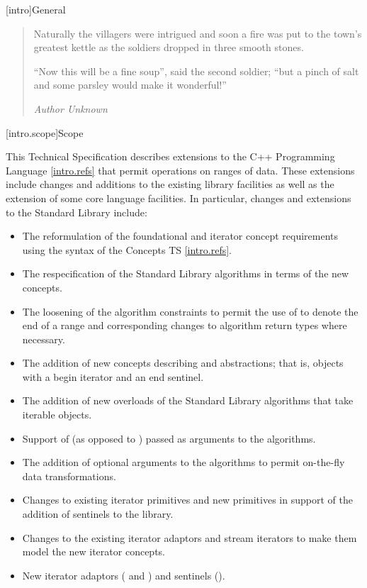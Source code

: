 [intro]{General}

\begin{quote}
Naturally the villagers were intrigued and soon a fire was put to the town's greatest
kettle as the soldiers dropped in three smooth stones.

``Now this will be a fine soup'', said the second soldier;
``but a pinch of salt and some parsley would make it wonderful!''
\begin{flushright}
\textemdash \textit{Author Unknown}
\end{flushright}
\end{quote}

[intro.scope]{Scope}

\pnum
This Technical Specification describes extensions to the C++
Programming Language \ref{intro.refs} that
permit operations on ranges of data. These extensions include
changes and additions to the existing library facilities as well
as the extension of some core language facilities. In particular,
changes and extensions to the Standard Library include:

\begin{itemize}
\item The reformulation of the foundational and iterator concept requirements
using the syntax of the Concepts TS \ref{intro.refs}.
\item The respecification of the Standard Library algorithms in terms of the new
concepts.
\item The loosening of the algorithm constraints to permit the use of
 to denote the end of a range and corresponding changes to algorithm
return types where necessary.
\item The addition of new concepts describing  and 
abstractions; that is, objects with a begin iterator and an end sentinel.
\item The addition of new overloads of the Standard Library algorithms that take iterable
objects.
\item Support of  (as opposed to )
passed as arguments to the algorithms.
\item The addition of optional  arguments to the algorithms to
permit on-the-fly data transformations.
\item Changes to existing iterator primitives and new primitives in support of the
addition of sentinels to the library.
\item Changes to the existing iterator adaptors and stream iterators to make them model
the new iterator concepts.
\item New iterator adaptors ( and ) and
sentinels ().
\end{itemize}


